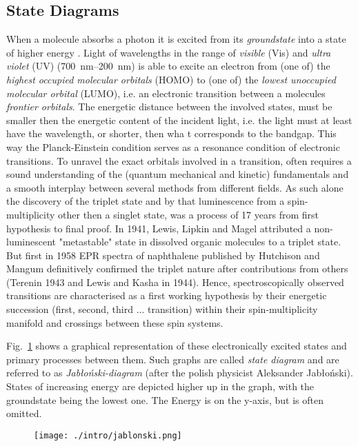 		\subsection{State Diagrams}
		When a molecule  absorbs a photon it is excited from its \emph{groundstate} into a state of higher energy . Light of wavelengths in the range of \emph{visible} (Vis) and \emph{ultra violet} (UV) (\qtyrange{700}{200}{\nm}) is able to excite an electron from (one of) the \emph{highest occupied molecular orbitals} (HOMO) to (one of) the \emph{lowest unoccupied molecular orbital} (LUMO), i.e. an electronic transition between a molecules \emph{frontier orbitals}. The energetic distance between the involved states, must be smaller then the energetic content of the incident light, i.e. the light must at least have the wavelength, or shorter, then wha  t corresponds to the bandgap. This way the Planck-Einstein condition serves as a resonance condition of electronic transitions. To unravel the exact orbitals involved in a transition, often requires a sound understanding of the (quantum mechanical and kinetic) fundamentals and a smooth interplay between several methods from different fields. As such alone the discovery of the triplet state and by that luminescence from a spin-multiplicity other then a singlet state, was a process of 17 years from first hypothesis to final proof. In 1941, Lewis, Lipkin and Magel attributed a non-luminescent "metastable" state in dissolved organic molecules to a triplet state. But first in 1958 EPR spectra of naphthalene published by Hutchison and Mangum definitively confirmed the triplet nature after contributions from others (Terenin 1943 and Lewis and Kasha in 1944). Hence, spectroscopically observed transitions are characterised as a first working hypothesis by their energetic succession (first, second, third ... transition) within their spin-multiplicity manifold and crossings between these spin systems.

		Fig.~\ref{fig:jablonski} shows a graphical representation of these electronically excited states and primary processes between them. Such graphs are called \emph{state diagram} and are referred to as \emph{Jabłoński-diagram} (after the polish physicist Aleksander Jabłoński). States of increasing energy are depicted higher up in the graph, with the groundstate being the lowest one. The Energy is on the y-axis, but is often omitted. 

		\begin{figure}[!h]
			\centering
			\label{fig:jablonski}
			\texttt{[image: ./intro/jablonski.png]}
			\caption{}
		\end{figure}
 		

